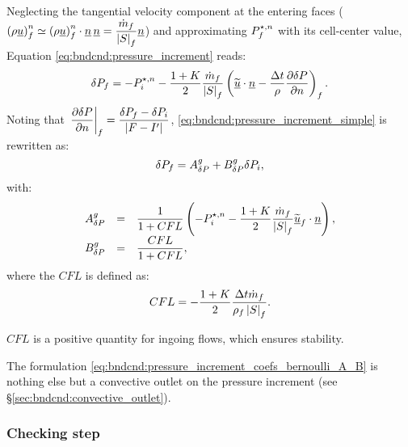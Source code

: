 Neglecting the tangential velocity component at the entering faces ($\left(\rho \underline{u} \right)^n_{f} \simeq \left(\rho \underline{u} \right)^n_{f} \cdot \underline{n} \, \underline{n} = \dfrac{ \dot{m}_{f} }{\left| S \right|_{f}} \underline{n} $) and approximating $P^{\star, n}_{f}$ with its cell-center value, Equation \ref{eq:bndcnd:pressure_increment} reads:
%
 \begin{equation}\label{eq:bndcnd:pressure_increment_simple}
\delta P_{f} = -P^{\star, n}_i - \dfrac{1+K}{2} \dfrac{ \dot{m}_{f} }{\left| S \right|_{f}}
\left( \widetilde{\underline{u}} \cdot \underline{n}
- \dfrac{\Delta t}{\rho} \dfrac{\partial \delta P }{\partial n} \right)_{f}.
\end{equation}
Noting that $  \left. \dfrac{\partial \delta P }{\partial n} \right|_{{f}} = \dfrac{\delta P_{f} -  \delta P_i }{\left| F - {I^\prime} \right|}$,  \eqref{eq:bndcnd:pressure_increment_simple} is rewritten as:
\begin{equation}\label{eq:bndcnd:pressure_increment_coefs_bernoulli}
\delta P_{f} = A^g_{\delta P} + B^g_{\delta P} \delta P_i,
\end{equation}
with:
\begin{equation}\label{eq:bndcnd:pressure_increment_coefs_bernoulli_A_B}
\begin{array}{r c l}
 A^g_{\delta P}  & = & \dfrac{1}{1 + CFL} \left( - P^{\star, n}_i - \dfrac{1+K}{2} \dfrac{ \dot{m}_{f} }{\left| S \right|_{f}}
\widetilde{\underline{u}}_{f} \cdot \underline{n}
  \right), \\
 B^g_{\delta P} & = & \dfrac{CFL}{1 + CFL} ,
\end{array}
\end{equation}
where the $CFL$ is defined as:
\begin{equation}\label{eq:bndcnd:pressure_increment_coefs_bernoulli_A_B}
CFL = - \dfrac{1+K}{2} \dfrac{\Delta t \dot{m}_{f} }{ \rho_{f} \left| S \right|_{f}}.
\end{equation}
%
\begin{remark}
$CFL$ is a positive quantity for ingoing flows, which ensures stability.
\end{remark}
\begin{remark}
The formulation \eqref{eq:bndcnd:pressure_increment_coefs_bernoulli_A_B} is nothing else but
a convective outlet on the pressure increment (see \S \ref{sec:bndcnd:convective_outlet}).
\end{remark}

\subsubsection{Checking step}


